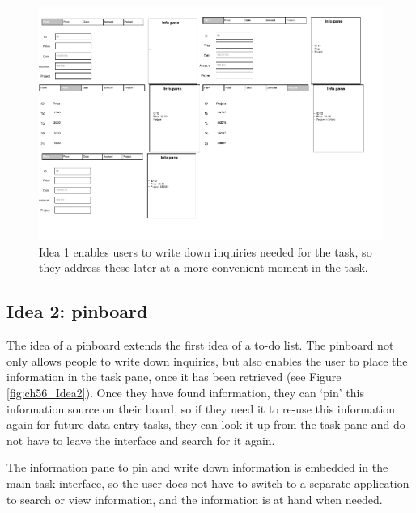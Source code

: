 \begin{figure}
\centering
\includegraphics[width=\textwidth]{images/ch56/ch56_Idea1.pdf}
\caption{Idea 1 enables users to write down inquiries needed for the task, so they address these later at a more convenient moment in the task.}
\label{fig:ch56_Idea1}
\end{figure}

\subsection{Idea 2: pinboard}
The idea of a pinboard extends the first idea of a to-do list. The pinboard not only allows people to write down inquiries, but also enables the user to place the information in the task pane, once it has been retrieved (see Figure \ref{fig:ch56_Idea2}). 
Once they have found information, they can ‘pin’ this information source on their board, so if they need it to re-use this information again for future data entry tasks, they can look it up from the task pane and do not have to leave the interface and search for it again.

The information pane to pin and write down information is embedded in the main task interface, so the user does not have to switch to a separate application to search or view information, and the information is at hand when needed. 

